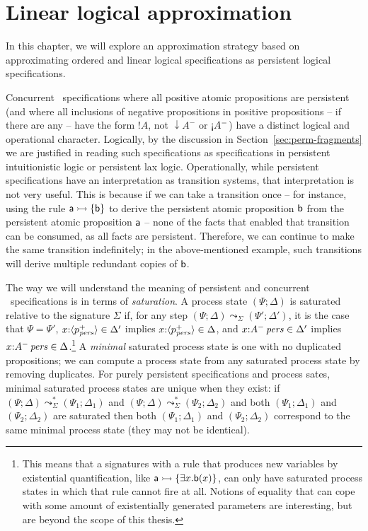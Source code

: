 \chapter{Linear logical approximation}
\label{chapter-approx}

In this chapter, we will explore an approximation strategy based on
approximating ordered and linear logical specifications as persistent
logical specifications. 

Concurrent \sls~specifications where all positive atomic propositions
are persistent (and where all inclusions of negative propositions in
positive propositions -- if there are any -- have the form ${!}A$, not
${\downarrow}A^-$ or ${\gnab}A^-$) have a distinct logical and
operational character. Logically, by the discussion in
Section~\ref{sec:perm-fragments} we are justified in reading such
specifications as specifications in persistent intuitionistic logic or
persistent lax logic. Operationally, while persistent specifications
have an interpretation as transition systems, that interpretation is
not very useful. This is because if we can take a transition once --
for instance, using the rule ${\sf a} \rightarrowtail \{ {\sf b} \}$ to derive
the persistent atomic proposition ${\sf b}$ from the persistent atomic
proposition ${\sf a}$ -- none of the facts that enabled that
transition can be consumed, as all facts are persistent. Therefore, we
can continue to make the same transition indefinitely; in the
above-mentioned example, such transitions will derive multiple
redundant copies of ${\sf b}$.

The way we will understand the meaning of persistent and
concurrent \sls~specifications is in terms of {\it saturation}. A
process state $(\Psi; \Delta)$ is saturated relative to the signature
$\Sigma$ if, for any step $(\Psi; \Delta) \leadsto_\Sigma (\Psi';
\Delta')$, it is the case that $\Psi = \Psi'$, $x{:}\langle {p^+_{\it pers}} \rangle
\in \Delta'$ implies $x{:}\langle {p^+_{\it pers}} \rangle \in \Delta$, and
$x{:}{A^-}\,{{\it pers}} \in \Delta'$ implies $x{:}{A^-}\,{{\it pers}} \in
\Delta$.\footnote{This means that a signatures with a rule that
  produces new variables by existential quantification, like ${\sf a}
  \rightarrowtail \{ \exists x. {\sf b}(x) \}$, can only have saturated process
  states in which that rule cannot fire at all. Notions of equality
  that can cope with some amount of existentially generated parameters
  are interesting, but are beyond the scope of this thesis.} A {\it
  minimal} saturated process state is one with no duplicated
propositions; we can compute a process state from any saturated
process state by removing duplicates. For purely persistent
specifications and process sates, minimal saturated process states are
unique when they exist: if $(\Psi; \Delta) \leadsto^*_\Sigma (\Psi_1;
\Delta_1)$ and $(\Psi; \Delta) \leadsto^*_\Sigma (\Psi_2; \Delta_2)$
and both $(\Psi_1; \Delta_1)$ and $(\Psi_2; \Delta_2)$ are saturated
then both $(\Psi_1; \Delta_1)$ and $(\Psi_2; \Delta_2)$ correspond to 
the same minimal process state (they may not be identical).

